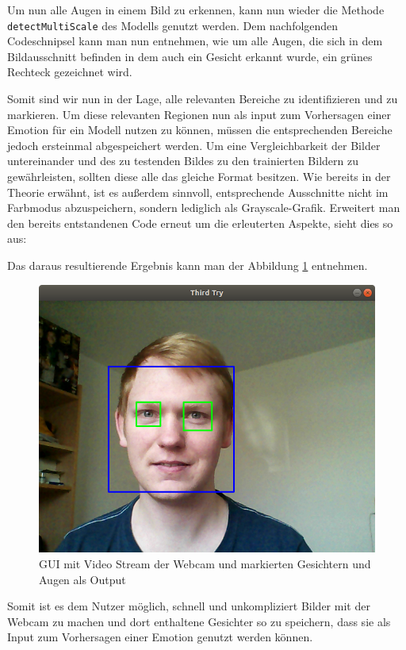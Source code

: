 \documentclass[12pt, a4paper]{report}
\begin{document}
Um nun alle Augen in einem Bild zu erkennen, kann nun wieder die Methode \texttt{detectMultiScale} des Modells genutzt werden. Dem nachfolgenden Codeschnipsel kann man nun entnehmen, wie um alle Augen, die sich in dem Bildausschnitt befinden in dem auch ein Gesicht erkannt wurde, ein grünes Rechteck gezeichnet wird.

Somit sind wir nun in der Lage, alle relevanten Bereiche zu identifizieren und zu markieren. Um diese relevanten Regionen nun als input zum Vorhersagen einer Emotion für ein Modell nutzen zu können, müssen die entsprechenden Bereiche jedoch ersteinmal abgespeichert werden. Um eine Vergleichbarkeit der Bilder untereinander und des zu testenden Bildes zu den trainierten Bildern zu gewährleisten, sollten diese alle das gleiche Format besitzen. Wie bereits in der Theorie erwähnt, ist es außerdem sinnvoll, entsprechende Ausschnitte nicht im Farbmodus abzuspeichern, sondern lediglich als Grayscale-Grafik. Erweitert man den bereits entstandenen Code erneut um die erleuterten Aspekte, sieht dies so aus:

Das daraus resultierende Ergebnis kann man der Abbildung \ref{fig:Input GUI 3} entnehmen.
\begin{figure}[h]
\includegraphics[width=\linewidth]{Bilder/InputGUI3.png}
\caption{GUI mit Video Stream der Webcam und markierten Gesichtern und Augen als Output}
\label{fig:Input GUI 3}
\end{figure}
Somit ist es dem Nutzer möglich, schnell und unkompliziert Bilder mit der Webcam zu machen und dort enthaltene Gesichter so zu speichern, dass sie als Input zum Vorhersagen einer Emotion genutzt werden können.
\end{document}
